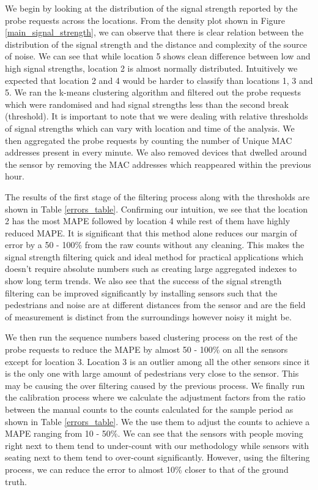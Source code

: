 We begin by looking at the distribution of the signal strength reported by the
probe requests across the locations. From the density plot shown in Figure
\ref{main_signal_strength}, we can observe that there is clear relation between
the distribution of the signal strength and the distance and complexity of the
source of noise. We can see that while location 5 shows clean difference
between low and high signal strengths, location 2 is almost normally
distributed.  Intuitively we expected that location 2 and 4 would be harder to
classify than locations 1, 3 and 5.  We ran the k-means clustering algorithm
and filtered out the probe requests which were randomised and had signal
strengths less than the second break (threshold).  It is important to note that
we were dealing with relative thresholds of signal strengths which can vary
with location and time of the analysis.  We then aggregated the probe requests
by counting the number of Unique MAC addresses present in every minute. We also
removed devices that dwelled around the sensor by removing the MAC
addresses which reappeared within the previous hour.

The results of the first stage of the filtering process along with the
thresholds are shown in Table \ref{errors_table}.  Confirming our intuition, we
see that the location 2 has the most MAPE followed by location 4 while rest of
them have highly reduced MAPE.  It is significant that this method alone
reduces our margin of error by a 50 - 100\% from the raw counts without any
cleaning.  This makes the signal strength filtering quick and ideal method for
practical applications which doesn't require absolute numbers such as creating
large aggregated indexes to show long term trends.  We also see that the
success of the signal strength filtering can be improved significantly by
installing sensors such that the pedestrians and noise are at different
distances from the sensor and are the field of measurement is distinct from the
surroundings however noisy it might be.

We then run the sequence numbers based clustering process on the rest of the
probe requests to reduce the MAPE by almost 50 - 100\% on all the sensors except
for location 3.  Location 3 is an outlier among all the other sensors since it
is the only one with large amount of pedestrians very close to the sensor.  This
may be causing the over filtering caused by the previous process.  We finally
run the calibration process where we calculate the adjustment factors from the
ratio between the manual counts to the counts calculated for the sample period
as shown in Table \ref{errors_table}.  We the use them to adjust the counts to
achieve a MAPE ranging from 10 - 50\%. We can see that the sensors with people
moving right next to them tend to under-count with our methodology while sensors
with seating next to them tend to over-count significantly. However, using the
filtering process, we can reduce the error to almost 10\% closer to that of the
ground truth.

